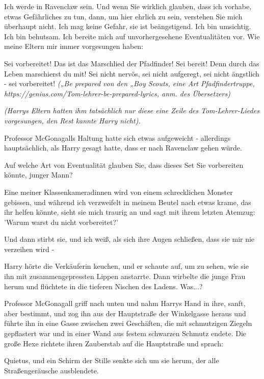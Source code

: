 \glqq Ich werde in Ravenclaw sein. Und wenn Sie wirklich glauben, dass ich
vorhabe, etwas Gefährliches zu tun, dann, um hier ehrlich zu sein, verstehen Sie
mich überhaupt nicht. Ich mag keine Gefahr, sie ist beängstigend. Ich bin
umsichtig. Ich bin behutsam. Ich bereite mich auf unvorhergesehene
Eventualitäten vor. Wie meine Eltern mir immer vorgesungen haben:

Sei vorbereitet! Das ist das Marschlied der Pfadfinder! Sei bereit! Denn durch
das Leben marschierst du mit! Sei nicht nervös, sei nicht aufgeregt, sei nicht
ängstlich - sei vorbereitet!\grqq{} \emph{(„Be prepared\grqq{} von den „Boy
Scouts\grqq{}, eine Art Pfadfindertruppe,
}\emph{https://genius.com/Tom-lehrer-be-prepared-lyrics}\emph{, anm. des
Übersetzers)}

\emph{(Harrys Eltern hatten ihm tatsächlich nur diese eine Zeile des
Tom-Lehrer-Liedes vorgesungen, den Rest kannte Harry nicht). }

Professor McGonagalls Haltung hatte sich etwas aufgeweicht - allerdings
hauptsächlich, als Harry gesagt hatte, dass er nach Ravenclaw gehen würde.

\glqq Auf welche Art von Eventualität glauben Sie, dass dieses Set Sie
vorbereiten könnte, junger Mann?\grqq{}

\glqq Eine meiner Klassenkameradinnen wird von einem schrecklichen Monster
gebissen, und während ich verzweifelt in meinem Beutel nach etwas krame, das ihr
helfen könnte, sieht sie mich traurig an und sagt mit ihrem letzten Atemzug:
'Warum warst du nicht vorbereitet?'

Und dann stirbt sie, und ich weiß, als sich ihre Augen schließen, dass sie mir
nie verzeihen wird -\grqq{}

Harry hörte die Verkäuferin keuchen, und er schaute auf, um zu sehen, wie sie
ihn mit zusammengepressten Lippen anstarrte. Dann wirbelte die junge Frau herum
und flüchtete in die tieferen Nischen des Ladens. Was...?

Professor McGonagall griff nach unten und nahm Harrys Hand in ihre, sanft, aber
bestimmt, und zog ihn aus der Hauptstraße der Winkelgasse heraus und führte ihn
in eine Gasse zwischen zwei Geschäften, die mit schmutzigen Ziegeln gepflastert
war und in einer Wand aus festem schwarzen Schmutz endete. Die große Hexe
richtete ihren Zauberstab auf die Hauptstraße und sprach:

\glqq Quietus\grqq{}, und ein Schirm der Stille senkte sich um sie herum, der
alle Straßengeräusche ausblendete.

